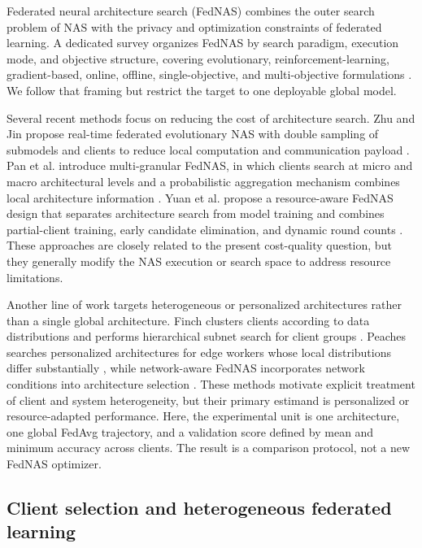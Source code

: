 \documentclass[11pt]{article}
\begin{document}
Federated neural architecture search (FedNAS) combines the outer search problem of NAS with the privacy and optimization constraints of federated learning. A dedicated survey organizes FedNAS by search paradigm, execution mode, and objective structure, covering evolutionary, reinforcement-learning, gradient-based, online, offline, single-objective, and multi-objective formulations \cite{zhu2021fednas}. We follow that framing but restrict the target to one deployable global model.

Several recent methods focus on reducing the cost of architecture search. Zhu and Jin propose real-time federated evolutionary NAS with double sampling of submodels and clients to reduce local computation and communication payload \cite{zhu2022realtime}. Pan et al. introduce multi-granular FedNAS, in which clients search at micro and macro architectural levels and a probabilistic aggregation mechanism combines local architecture information \cite{pan2021mgfnas}. Yuan et al. propose a resource-aware FedNAS design that separates architecture search from model training and combines partial-client training, early candidate elimination, and dynamic round counts \cite{yuan2024fednas}. These approaches are closely related to the present cost-quality question, but they generally modify the NAS execution or search space to address resource limitations.

Another line of work targets heterogeneous or personalized architectures rather than a single global architecture. Finch clusters clients according to data distributions and performs hierarchical subnet search for client groups \cite{liu2024finch}. Peaches searches personalized architectures for edge workers whose local distributions differ substantially \cite{yan2024peaches}, while network-aware FedNAS incorporates network conditions into architecture selection \cite{ocal2025network}. These methods motivate explicit treatment of client and system heterogeneity, but their primary estimand is personalized or resource-adapted performance. Here, the experimental unit is one architecture, one global FedAvg trajectory, and a validation score defined by mean and minimum accuracy across clients. The result is a comparison protocol, not a new FedNAS optimizer.

\subsection{Client selection and heterogeneous federated learning}
\end{document}
